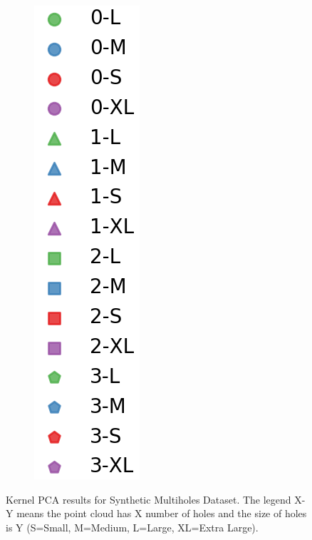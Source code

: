 \documentclass[10pt]{article}
\begin{document}
\begin{figure}[H]
\begin{subfigure}[h]{0.05\textwidth}
        \includegraphics[width=\linewidth]{mh_legend}
    \end{subfigure}%
    \caption{Kernel PCA results for Synthetic Multiholes Dataset. The legend X-Y means the point cloud has X number of holes and the size of holes is Y (S=Small, M=Medium, L=Large, XL=Extra Large).}
    \label{fig:mh_kernels}
\end{figure}
\end{document}
